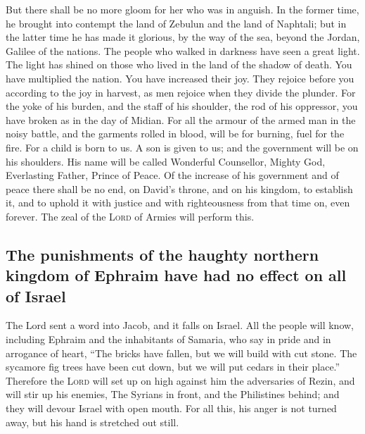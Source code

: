 But there shall be no more gloom for her who was in
anguish. In the former time, he brought into contempt the land of
Zebulun and the land of Naphtali; but in the latter time he has made it
glorious, by the way of the sea, beyond the Jordan, Galilee of the
nations.  The people who walked in darkness have seen a
great light. The light has shined on those who lived in the land of the
shadow of death.  You have multiplied the nation. You have
increased their joy. They rejoice before you according to the joy in
harvest, as men rejoice when they divide the plunder.  For
the yoke of his burden, and the staff of his shoulder, the rod of his
oppressor, you have broken as in the day of Midian.  For
all the armour of the armed man in the noisy battle, and the garments
rolled in blood, will be for burning, fuel for the fire. 
For a child is born to us. A son is given to us; and the government will
be on his shoulders. His name will be called Wonderful Counsellor,
Mighty God, Everlasting Father, Prince of Peace.  Of the
increase of his government and of peace there shall be no end, on
David's throne, and on his kingdom, to establish it, and to uphold it
with justice and with righteousness from that time on, even forever. The
zeal of the \textsc{Lord} of Armies will perform this.

\hypertarget{the-punishments-of-the-haughty-northern-kingdom-of-ephraim-have-had-no-effect-on-all-of-israel}{%
\subsection{The punishments of the haughty northern kingdom of Ephraim
have had no effect on all of
Israel}\label{the-punishments-of-the-haughty-northern-kingdom-of-ephraim-have-had-no-effect-on-all-of-israel}}

 The Lord sent a word into Jacob, and it falls on Israel.
 All the people will know, including Ephraim and the
inhabitants of Samaria, who say in pride and in arrogance of heart,
 ``The bricks have fallen, but we will build with cut
stone. The sycamore fig trees have been cut down, but we will put cedars
in their place.''  Therefore the \textsc{Lord} will set
up on high against him the adversaries of Rezin, and will stir up his
enemies,  The Syrians in front, and the Philistines
behind; and they will devour Israel with open mouth. For all this, his
anger is not turned away, but his hand is stretched out still.

